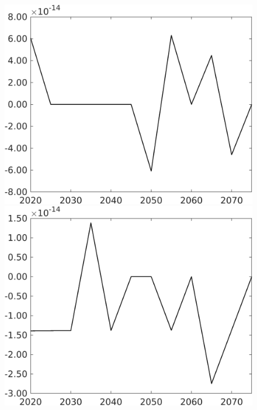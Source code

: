 \begin{figure}[h!!]
\begin{minipage}[]{0.32\textwidth}
\end{minipage}		
\begin{minipage}[]{0.32\textwidth}
\includegraphics[width=1\textwidth]{../../codding_model/own_basedOnFried/optimalPol_010922_revision/figures/all_13Sept22/CompTaul_Equlab_LFBAUPer_Reg0_pee_spillover0_nsk1_xgr1_knspil0_sep1_countec0_GovRev0_etaa0.79.png}
\end{minipage}	
\begin{minipage}[]{0.32\textwidth}
\includegraphics[width=1\textwidth]{../../codding_model/own_basedOnFried/optimalPol_010922_revision/figures/all_13Sept22/CompTaul_Equlab_LFBAUPer_Reg0_pn_spillover0_nsk1_xgr1_knspil0_sep1_countec0_GovRev0_etaa0.79.png}

\end{minipage}
\end{figure}
